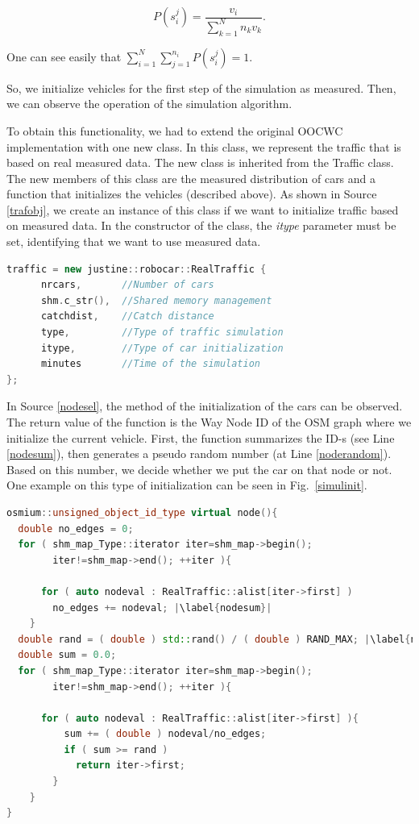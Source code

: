 \documentclass[b5paper,12pt]{report}
\theoremstyle{definition}
\begin{document}
\[P(s_i^j)=\frac{v_i}{\sum_{k=1}^{N}{n_kv_k}}.\]

One can see easily that $\sum_{i=1}^{N}\sum_{j=1}^{n_i}P(s_i^j) = 1$.

So, we initialize vehicles for the first step of the simulation as measured. Then, we can observe the operation of the simulation algorithm.

To obtain this functionality, we had to extend the original OOCWC implementation with one new class. In this class, we represent the traffic that is based on real measured data. The new class is inherited from the Traffic class. The new members of this class are the measured distribution of cars and a function that initializes the vehicles (described above). As shown in Source \ref{trafobj}, we create an instance of this class if we want to initialize traffic based on measured data. In the constructor of the class, the \emph{itype} parameter must be set, identifying that we want to use measured data.

\begin{lstlisting}[language=C++,caption=Creating a RealTraffic object., label=trafobj]
traffic = new justine::robocar::RealTraffic {
      nrcars,       //Number of cars 
      shm.c_str(),  //Shared memory management
      catchdist,    //Catch distance 
      type,         //Type of traffic simulation
      itype,        //Type of car initialization  
      minutes       //Time of the simulation 
};
\end{lstlisting}

In Source \ref{nodesel}, the method of the initialization of the cars can be observed. The return value of the function is the Way Node ID of the OSM graph where we initialize the current vehicle. First, the function summarizes the ID-s (see Line \ref{nodesum}), then generates a pseudo random number (at Line \ref{noderandom}). Based on this number, we decide whether we put the car on that node or not. One example on this type of initialization can be seen in Fig.~\ref{simulinit}.

\begin{lstlisting}[language=C++,caption=Initialization., label=nodesel, escapechar={|}]
osmium::unsigned_object_id_type virtual node(){
  double no_edges = 0;
  for ( shm_map_Type::iterator iter=shm_map->begin();
        iter!=shm_map->end(); ++iter ){

      for ( auto nodeval : RealTraffic::alist[iter->first] )
        no_edges += nodeval; |\label{nodesum}|
    }
  double rand = ( double ) std::rand() / ( double ) RAND_MAX; |\label{noderandom}|
  double sum = 0.0;
  for ( shm_map_Type::iterator iter=shm_map->begin();
        iter!=shm_map->end(); ++iter ){

      for ( auto nodeval : RealTraffic::alist[iter->first] ){
          sum += ( double ) nodeval/no_edges;
          if ( sum >= rand )
            return iter->first;
        }
    }
}
\end{lstlisting}
\end{document}
